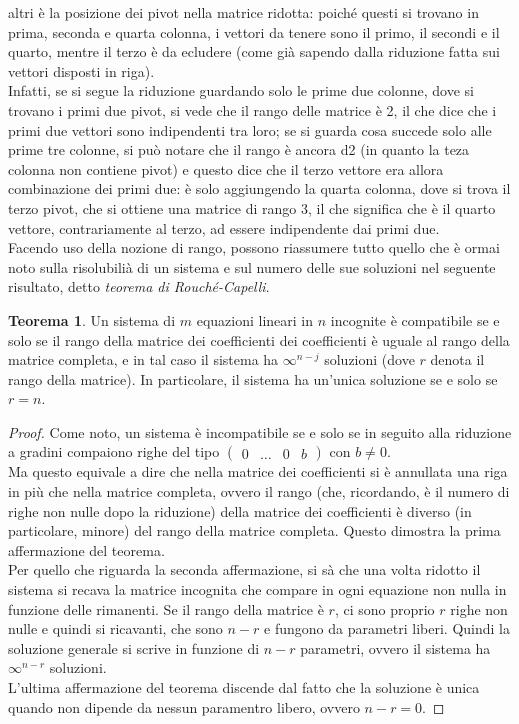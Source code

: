 \documentclass{book}
\theoremstyle{definition}
\newtheorem{teo}{Teorema}[section]
\theoremstyle{plain}
\begin{document}
altri è la posizione dei pivot nella matrice ridotta: poiché questi si
trovano in prima, seconda e quarta colonna, i vettori da tenere sono il
primo, il secondi e il quarto, mentre il terzo è da ecludere (come già
sapendo dalla riduzione fatta sui vettori disposti in riga).\\
Infatti, se si segue la riduzione guardando solo le prime due colonne,
dove si trovano i primi due pivot, si vede che il rango delle matrice è
2, il che dice che i primi due vettori sono indipendenti tra loro; se
si guarda cosa succede solo alle prime tre colonne, si può notare che
il rango è ancora d2 (in quanto la teza colonna non contiene pivot) e
questo dice che il terzo vettore era allora combinazione dei primi due:
è solo aggiungendo la quarta colonna, dove si trova il terzo pivot, che
si ottiene una matrice di rango 3, il che significa che è il quarto
vettore, contrariamente al terzo, ad essere indipendente dai primi due.\\
Facendo uso della nozione di rango, possono riassumere tutto quello che
è ormai noto sulla risolubilià di un sistema e sul numero delle sue
soluzioni nel seguente risultato, detto \textit{teorema di
  Rouché-Capelli}.
\begin{teo}
  \label{teo:gauss-jordan1}
  Un sistema di $m$ equazioni lineari in $n$ incognite è compatibile se
  e solo se il rango della matrice dei coefficienti dei coefficienti è
  uguale al rango della matrice completa, e in tal caso il sistema ha
  $\infty^{n-j}$ soluzioni (dove $r$ denota il rango della matrice). In
  particolare, il sistema ha un'unica soluzione se e solo se $r=n$.
\end{teo}
\begin{proof}
  Come noto, un sistema è incompatibile se e solo se in seguito alla
  riduzione a gradini compaiono righe del tipo $
  \left(\begin{array}{ccc|c}
    0&\dots&0&b
  \end{array}\right)
  $ con $b\neq 0$.\\
  Ma questo equivale a dire che nella matrice dei coefficienti si è
  annullata una riga in più che nella matrice completa, ovvero il rango
  (che, ricordando, è il numero di righe non nulle dopo la riduzione)
  della matrice dei coefficienti è diverso (in particolare, minore) del
  rango della matrice completa. Questo dimostra la prima affermazione del
  teorema.\\
  Per quello che riguarda la seconda affermazione, si sà che una volta
  ridotto il sistema si recava la matrice incognita che compare in ogni
  equazione non nulla in funzione delle rimanenti. Se il rango della
  matrice è $r$, ci sono proprio $r$ righe non nulle e quindi si
  ricavanti, che sono $n-r$ e fungono da parametri liberi. Quindi la
  soluzione generale si scrive in funzione di $n-r$ parametri, ovvero il
  sistema ha $\infty^{n-r}$ soluzioni.\\
  L'ultima affermazione del teorema discende dal fatto che la soluzione è
  unica quando non dipende da nessun paramentro libero, ovvero $n-r=0.$
\end{proof}
\end{document}
